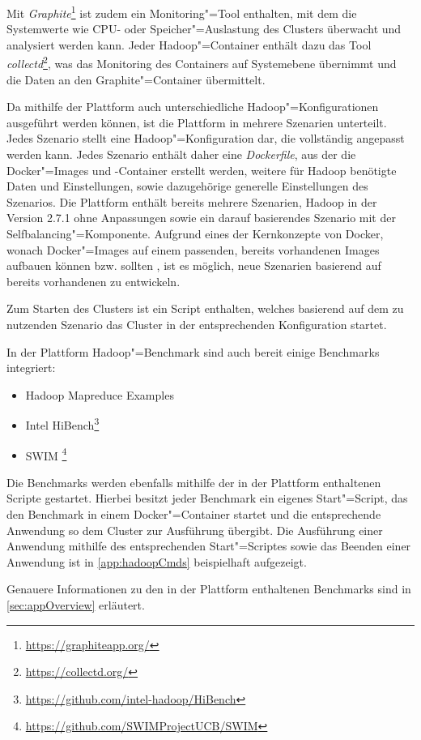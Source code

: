 Mit \emph{Graphite}\footnote{\url{https://graphiteapp.org/}} ist zudem ein Monitoring"=Tool enthalten, mit dem die Systemwerte wie CPU- oder Speicher"=Auslastung des Clusters überwacht und analysiert werden kann.
Jeder Hadoop"=Container enthält dazu das Tool \emph{collectd}\footnote{\url{https://collectd.org/}}, was das Monitoring des Containers auf Systemebene übernimmt und die Daten an den Graphite"=Container übermittelt.

Da mithilfe der Plattform auch unterschiedliche Hadoop"=Konfigurationen ausgeführt werden können, ist die Plattform in mehrere Szenarien unterteilt.
Jedes Szenario stellt eine Hadoop"=Konfiguration dar, die vollständig angepasst werden kann.
Jedes Szenario enthält daher eine \emph{Dockerfile}, aus der die Docker"=Images und -Container erstellt werden, weitere für Hadoop benötigte Daten und Einstellungen, sowie dazugehörige generelle Einstellungen des Szenarios.
Die Plattform enthält bereits mehrere Szenarien, \uA Hadoop in der Version 2.7.1 ohne Anpassungen sowie ein darauf basierendes Szenario mit der Selfbalancing"=Komponente.
Aufgrund eines der Kernkonzepte von Docker, wonach Docker"=Images auf einem passenden, bereits vorhandenen Images aufbauen können bzw. sollten \cite{DockerdevBestPractice}, ist es möglich, neue Szenarien basierend auf bereits vorhandenen zu entwickeln.

Zum Starten des Clusters ist ein Script enthalten, welches basierend auf dem zu nutzenden Szenario das Cluster in der entsprechenden Konfiguration startet.

In der Plattform Hadoop"=Benchmark sind auch bereit einige Benchmarks integriert:

\begin{itemize}
    \item Hadoop Mapreduce Examples
    \item Intel HiBench\footnote{\url{https://github.com/intel-hadoop/HiBench}}
    \item \gls{SWIM} \footnote{\url{https://github.com/SWIMProjectUCB/SWIM}}
\end{itemize}

Die Benchmarks werden ebenfalls mithilfe der in der Plattform enthaltenen Scripte gestartet.
Hierbei besitzt jeder Benchmark ein eigenes Start"=Script, das den Benchmark in einem Docker"=Container startet und die entsprechende \gls{Anwendung} so dem Cluster zur Ausführung übergibt.
Die Ausführung einer \gls{Anwendung} mithilfe des entsprechenden Start"=Scriptes sowie das Beenden einer \gls{Anwendung} ist in \cref{app:hadoopCmds} beispielhaft aufgezeigt.

Genauere Informationen zu den in der Plattform enthaltenen Benchmarks sind in \cref{sec:appOverview} erläutert.
